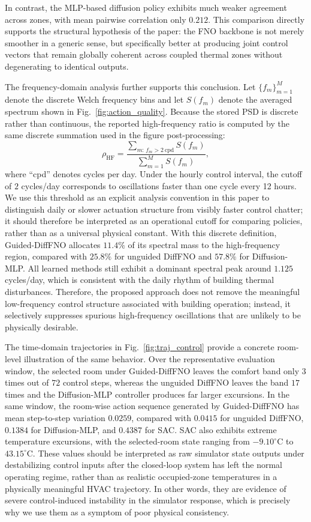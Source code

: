 In contrast, the MLP-based diffusion policy exhibits much weaker agreement across zones, with mean pairwise correlation only $0.212$. This comparison directly supports the structural hypothesis of the paper: the FNO backbone is not merely smoother in a generic sense, but specifically better at producing joint control vectors that remain globally coherent across coupled thermal zones without degenerating to identical outputs.

The frequency-domain analysis further supports this conclusion. Let $\{f_m\}_{m=1}^{M}$ denote the discrete Welch frequency bins and let $S(f_m)$ denote the averaged spectrum shown in Fig.~\ref{fig:action_quality}. Because the stored PSD is discrete rather than continuous, the reported high-frequency ratio is computed by the same discrete summation used in the figure post-processing:
\begin{equation}
\rho_{\mathrm{HF}}=\frac{\sum_{m:\,f_m>2\ \mathrm{cpd}} S(f_m)}{\sum_{m=1}^{M} S(f_m)},
\label{eq:hf_ratio}
\end{equation}
where ``cpd'' denotes cycles per day. Under the hourly control interval, the cutoff of $2$ cycles/day corresponds to oscillations faster than one cycle every 12 hours. We use this threshold as an explicit analysis convention in this paper to distinguish daily or slower actuation structure from visibly faster control chatter; it should therefore be interpreted as an operational cutoff for comparing policies, rather than as a universal physical constant. With this discrete definition, Guided-DiffFNO allocates $11.4\%$ of its spectral mass to the high-frequency region, compared with $25.8\%$ for unguided DiffFNO and $57.8\%$ for Diffusion-MLP. All learned methods still exhibit a dominant spectral peak around $1.125$ cycles/day, which is consistent with the daily rhythm of building thermal disturbances. Therefore, the proposed approach does not remove the meaningful low-frequency control structure associated with building operation; instead, it selectively suppresses spurious high-frequency oscillations that are unlikely to be physically desirable.

The time-domain trajectories in Fig.~\ref{fig:traj_control} provide a concrete room-level illustration of the same behavior. Over the representative evaluation window, the selected room under Guided-DiffFNO leaves the comfort band only $3$ times out of $72$ control steps, whereas the unguided DiffFNO leaves the band $17$ times and the Diffusion-MLP controller produces far larger excursions. In the same window, the room-wise action sequence generated by Guided-DiffFNO has mean step-to-step variation $0.0259$, compared with $0.0415$ for unguided DiffFNO, $0.1384$ for Diffusion-MLP, and $0.4387$ for SAC. SAC also exhibits extreme temperature excursions, with the selected-room state ranging from $-9.10^\circ$C to $43.15^\circ$C. These values should be interpreted as raw simulator state outputs under destabilizing control inputs after the closed-loop system has left the normal operating regime, rather than as realistic occupied-zone temperatures in a physically meaningful HVAC trajectory. In other words, they are evidence of severe control-induced instability in the simulator response, which is precisely why we use them as a symptom of poor physical consistency.

